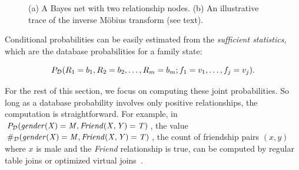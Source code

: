 \documentclass[oribibl]{llncs}
\begin{document}
\begin{figure}[tb]
\begin{center}
\caption{(a) A Bayes net with two relationship nodes. (b) An illustrative trace of the inverse M\"obius transform (see text). 
\label{fig:example}}
\end{center}
\end{figure}


Conditional probabilities can be easily estimated from the {\em sufficient statistics}, which are the database probabilities for a family state:

\begin{equation} \label{eq:joint-prob}
P_{\mathcal{D}}(R_{1} = b_{1}, R_{2} = b_{2},\ldots, R_{m} = b_{m}; f_{1} = v_{1},\ldots,f_{j} = v_{j}).
\end{equation}

\noindent For the rest of this section, we focus on computing these joint probabilities. So long as a database probability involves only positive relationships,
the computation is straightforward. 
For example, in 
$P_{\mathcal{D}}(\it{gender}(X) = M, \it{Friend}(X,Y) = \mathit{T})$, the value  $\#_{\mathcal{D}}(\it{gender}(X) = M, \it{Friend}(X,Y) = \mathit{T})$, the count of friendship pairs $(x,y)$ where $x$ is male and the
{\em Friend} relationship is true, can be computed by regular table joins or optimized virtual joins~\cite{Yin2004}. 
\end{document}
